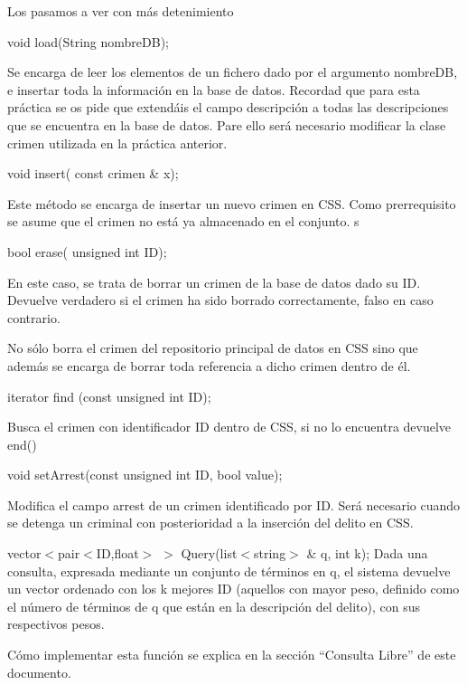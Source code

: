 Los pasamos a ver con más detenimiento

\begin{DoxyItemize}
\item void load(\+String nombre\+D\+B);\end{DoxyItemize}
Se encarga de leer los elementos de un fichero dado por el argumento nombre\+D\+B, e insertar toda la información en la base de datos. Recordad que para esta práctica se os pide que extendáis el campo descripción a todas las descripciones que se encuentra en la base de datos. Pare ello será necesario modificar la clase crimen utilizada en la práctica anterior.

\begin{DoxyItemize}
\item void insert( const crimen \& x);\end{DoxyItemize}
Este método se encarga de insertar un nuevo crimen en C\+S\+S. Como prerrequisito se asume que el crimen no está ya almacenado en el conjunto. s \begin{DoxyItemize}
\item bool erase( unsigned int I\+D);\end{DoxyItemize}
En este caso, se trata de borrar un crimen de la base de datos dado su I\+D. Devuelve verdadero si el crimen ha sido borrado correctamente, falso en caso contrario.

No sólo borra el crimen del repositorio principal de datos en C\+S\+S sino que además se encarga de borrar toda referencia a dicho crimen dentro de él.

\begin{DoxyItemize}
\item iterator find (const unsigned int I\+D);\end{DoxyItemize}
Busca el crimen con identificador I\+D dentro de C\+S\+S, si no lo encuentra devuelve end()

\begin{DoxyItemize}
\item void set\+Arrest(const unsigned int I\+D, bool value);\end{DoxyItemize}
Modifica el campo arrest de un crimen identificado por I\+D. Será necesario cuando se detenga un criminal con posterioridad a la inserción del delito en C\+S\+S.

\begin{DoxyItemize}
\item vector$<$pair$<$\+I\+D,float$>$ $>$ Query(list$<$string$>$ \& q, int k); Dada una consulta, expresada mediante un conjunto de términos en q, el sistema devuelve un vector ordenado con los k mejores I\+D (aquellos con mayor peso, definido como el número de términos de q que están en la descripción del delito), con sus respectivos pesos.\end{DoxyItemize}
Cómo implementar esta función se explica en la sección “\+Consulta Libre” de este documento.

